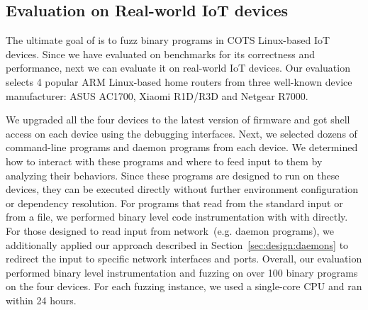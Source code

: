 \subsection{Evaluation on Real-world IoT devices}\label{sec:eval:real}

The ultimate goal of \sysname is to fuzz binary programs in COTS Linux-based IoT devices. Since we have evaluated \sysname on benchmarks for its correctness and performance, next we can evaluate it on real-world IoT devices. Our evaluation selects 4 popular ARM Linux-based home routers from three well-known device manufacturer: ASUS AC1700, Xiaomi R1D/R3D and Netgear R7000. 



We upgraded all the four devices to the latest version of firmware and got shell access on each device using the debugging interfaces. Next, we selected dozens of command-line programs and daemon programs from each device. We determined how to interact with these programs and where to feed input to them by analyzing their behaviors. Since these programs are designed to run on these devices, they can be executed directly without further environment configuration or dependency resolution. For programs that read from the standard input or from a file, we performed binary level code instrumentation with with \sysname directly. For those designed to read input from network~(e.g. daemon programs), we additionally applied our approach described in Section~\ref{sec:design:daemons} to redirect the input to specific network interfaces and ports. Overall, our evaluation performed binary level instrumentation and fuzzing on over 100 binary programs on the four devices. For each fuzzing instance, we used a single-core CPU and ran within 24 hours.

